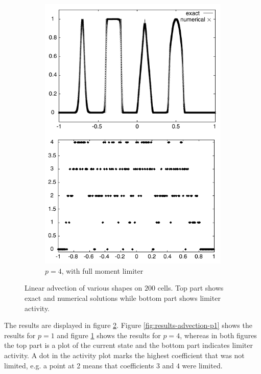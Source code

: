 \begin{figure}[h]
\begin{subfigure}[t]{0.48\columnwidth}
    \includegraphics[width=\textwidth]{figures/moment-p-4}
    \caption{$p = 4$, with full moment limiter}
    \label{fig:results-advection-p4}
  \end{subfigure}
  \caption{Linear advection of various shapes on $200$ cells. Top part shows exact and numerical solutions while bottom part shows limiter activity. \cite[figure 2]{Krivodonova}}
  \label{fig:results-advection}
\end{figure}

The results are displayed in figure \ref{fig:results-advection}.
Figure \ref{fig:results-advection-p1} shows the results for $p = 1$ and figure \ref{fig:results-advection-p4} shows the results for $p = 4$, whereas in both figures the top part is a plot of the current state and the bottom part indicates limiter activity.
A dot in the activity plot marks the highest coefficient that was not limited, e.g. a point at 2 means that coefficients $3$ and $4$ were limited.

